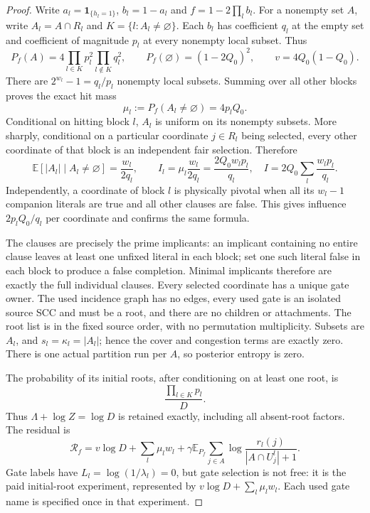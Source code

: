 \documentclass{article}
\begin{document}
\begin{proof}
Write $a_l=\mathbf1_{\{h_l=1\}}$, $b_l=1-a_l$ and $f=1-2\prod_lb_l$. For a nonempty set $A$, write $A_l=A\cap R_l$ and $K=\{l:A_l\ne\varnothing\}$. Each $b_l$ has coefficient $q_l$ at the empty set and coefficient of magnitude $p_l$ at every nonempty local subset. Thus
\[
 P_f(A)=4\prod_{l\in K}p_l^2\prod_{l\notin K}q_l^2,
 \qquad P_f(\varnothing)=(1-2Q_0)^2,
 \qquad v=4Q_0(1-Q_0).
\]
There are $2^{w_l}-1=q_l/p_l$ nonempty local subsets. Summing over all other blocks proves the exact hit mass
\[
 \mu_l:=P_f(A_l\ne\varnothing)=4p_lQ_0.
\]
Conditional on hitting block $l$, $A_l$ is uniform on its nonempty subsets. More sharply, conditional on a particular coordinate $j\in R_l$ being selected, every other coordinate of that block is an independent fair selection. Therefore
\[
 \mathbb E[|A_l|\mid A_l\ne\varnothing]=\frac{w_l}{2q_l},
 \qquad I_l=\mu_l\frac{w_l}{2q_l}
              =\frac{2Q_0w_lp_l}{q_l},\quad
 I=2Q_0\sum_l\frac{w_lp_l}{q_l}.
\]
Independently, a coordinate of block $l$ is physically pivotal when all its $w_l-1$ companion literals are true and all other clauses are false. This gives influence $2p_lQ_0/q_l$ per coordinate and confirms the same formula.

The clauses are precisely the prime implicants: an implicant containing no entire clause leaves at least one unfixed literal in each block; set one such literal false in each block to produce a false completion. Minimal implicants therefore are exactly the full individual clauses. Every selected coordinate has a unique gate owner. The used incidence graph has no edges, every used gate is an isolated source SCC and must be a root, and there are no children or attachments. The root list is in the fixed source order, with no permutation multiplicity. Subsets are $A_l$, and $s_l=\kappa_l=|A_l|$; hence the cover and congestion terms are exactly zero. There is one actual partition run per $A$, so posterior entropy is zero.

The probability of its initial roots, after conditioning on at least one root, is
\[
 \frac{\prod_{l\in K}p_l}{D}.
\]
Thus $\Lambda+\log Z=\log D$ is retained exactly, including all absent-root factors. The residual is
\[
 \mathcal R_f=v\log D+\sum_l\mu_lw_l
 +\gamma\mathbb E_{P_f}\sum_{j\in A}
       \log\frac{r_l(j)}{|A\cap U_j^l|+1}.
 \tag{1}
\]
Gate labels have $L_l=\log(1/\lambda_l)=0$, but gate selection is not free: it is the paid initial-root experiment, represented by $v\log D+\sum_l\mu_lw_l$. Each used gate name is specified once in that experiment.


\end{proof}
\end{document}
